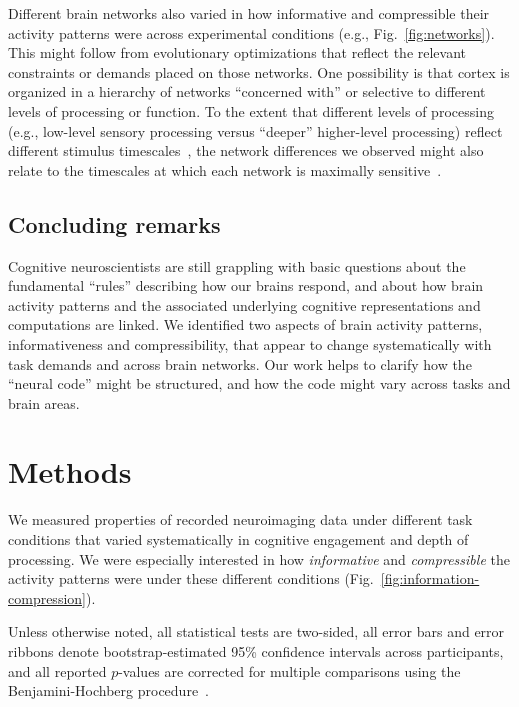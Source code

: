 \documentclass[english, 11pt]{article}
\begin{document}
Different brain networks also varied in how informative and compressible their
activity patterns were across experimental conditions (e.g.,
Fig.~\ref{fig:networks}). This might follow from evolutionary optimizations
that reflect the relevant constraints or demands placed on those networks. One
possibility is that cortex is organized in a hierarchy of networks ``concerned
with'' or selective to different levels of processing or function. To the
extent that different levels of processing (e.g., low-level sensory processing
versus ``deeper'' higher-level processing) reflect different stimulus
timescales~\citep[e.g.,][]{Mann20}, the network differences we observed might
also relate to the timescales at which each network is maximally
sensitive~\citep{RegeEtal18, BaldEtal17,LernEtal11, HassEtal08}.

\subsection*{Concluding remarks}

Cognitive neuroscientists are still grappling with basic questions about the
fundamental ``rules'' describing how our brains respond, and about how brain
activity patterns and the associated underlying cognitive representations and
computations are linked. We identified two aspects of brain activity patterns,
informativeness and compressibility, that appear to change systematically with
task demands and across brain networks. Our work helps to clarify how the
``neural code'' might be structured, and how the code might vary across tasks
and brain areas.

\section*{Methods}

We measured properties of recorded neuroimaging data under different task
conditions that varied systematically in cognitive engagement and depth of
processing. We were especially interested in how \textit{informative} and
\textit{compressible} the activity patterns were under these different
conditions (Fig.~\ref{fig:information-compression}).

Unless otherwise noted, all statistical tests are two-sided, all error bars and
error ribbons denote bootstrap-estimated 95\% confidence intervals across
participants, and all reported $p$-values are corrected for multiple
comparisons using the Benjamini-Hochberg procedure~\citep{BenjHoch95}.
\end{document}
